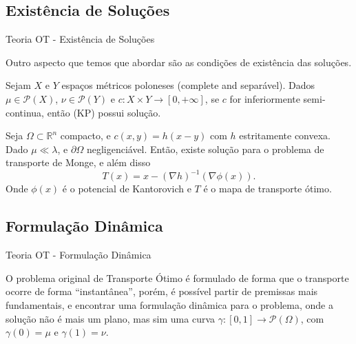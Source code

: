 \documentclass[10pt]{beamer}
\begin{document}
\subsection{Existência de Soluções}
\begin{frame}[fragile]{Teoria OT - Existência de Soluções}

	Outro aspecto que temos que abordar são as condições de existência das soluções.
	\begin{theorem}
		Sejam $X$ e $Y$ espaços métricos poloneses (complete and separável).
		Dados $\mu\in \mathcal{P}(X)$, $\nu \in \mathcal P(Y)$ e
		$c:X\times Y \to[0,+\infty]$, se $c$ for inferiormente semi-continua, então
		(KP) possui solução.
		\label{thm:existanceKPpolish}
	\end{theorem}
	\begin{theorem}
		Seja $\Omega \subset \mathbb R^n$ compacto, e 
		$c(x,y) = h(x-y)$ com $h$ estritamente convexa.
		Dado $\mu \ll \lambda$, e $\partial \Omega$ negligenciável.
		Então, existe solução para o problema de transporte de Monge,
		e além disso
		\begin{equation}
			T(x) = x - (\nabla h)^{-1}(\nabla \phi(x)).
		\end{equation}
		Onde $\phi(x)$ é o potencial de Kantorovich e $T$ é o
		mapa de transporte ótimo.
		\label{thm:existanceMonge}
	\end{theorem}

\end{frame}

\subsection{Formulação Dinâmica}
\begin{frame}[fragile]{Teoria OT - Formulação Dinâmica}

	O problema original de Transporte Ótimo é formulado de forma
	que o transporte ocorre de forma ``instantânea'', porém,
	é possível partir de premissas mais fundamentais, e
	encontrar uma formulação dinâmica para o problema,
	onde a solução não é mais um plano, mas sim uma
	curva $\gamma:[0,1] \to \mathcal P(\Omega)$, com
	$\gamma(0)=\mu$ e $\gamma(1) = \nu$.

\end{frame}
\end{document}
